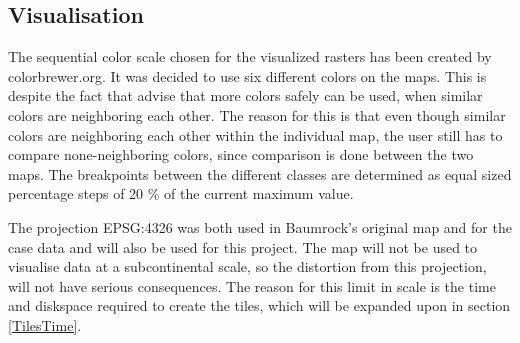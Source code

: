 \subsection{Visualisation}
The sequential color scale chosen for the visualized rasters has been created by colorbrewer.org. It was decided to use six different colors on the maps. This is despite the fact that \citet{ColorBrewer} advise that more colors safely can be used, when similar colors are neighboring each other. The reason for this is that even though similar colors are neighboring each other within the individual map, the user still has to compare none-neighboring colors, since comparison is done between the two maps. The breakpoints between the different classes are determined as equal sized percentage steps of 20 \% of the current maximum value.  

The projection EPSG:4326 was both used in Baumrock's original map and for the case data and will also be used for this project. The map will not be used to visualise data at a subcontinental scale, so the distortion from this projection, will not have serious consequences. The reason for this limit in scale is the time and diskspace required to create the tiles, which will be expanded upon in section \ref{TilesTime}.
